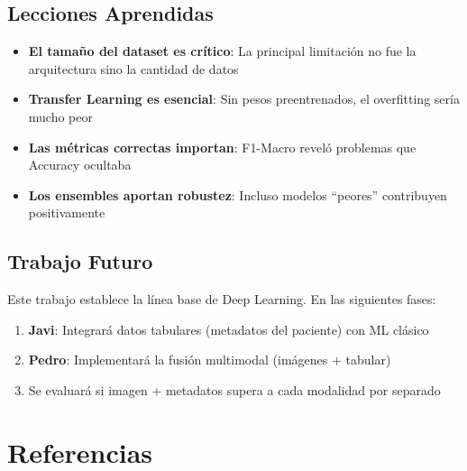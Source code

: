 \documentclass[12pt,a4paper]{article}
\begin{document}
\subsection{Lecciones Aprendidas}

\begin{itemize}
    \item \textbf{El tamaño del dataset es crítico}: La principal limitación no fue la arquitectura sino la cantidad de datos
    \item \textbf{Transfer Learning es esencial}: Sin pesos preentrenados, el overfitting sería mucho peor
    \item \textbf{Las métricas correctas importan}: F1-Macro reveló problemas que Accuracy ocultaba
    \item \textbf{Los ensembles aportan robustez}: Incluso modelos ``peores'' contribuyen positivamente
\end{itemize}

\subsection{Trabajo Futuro}

Este trabajo establece la línea base de Deep Learning. En las siguientes fases:

\begin{enumerate}
    \item \textbf{Javi}: Integrará datos tabulares (metadatos del paciente) con ML clásico
    \item \textbf{Pedro}: Implementará la fusión multimodal (imágenes + tabular)
    \item Se evaluará si imagen + metadatos supera a cada modalidad por separado
\end{enumerate}

\newpage
\section*{Referencias}
\end{document}
